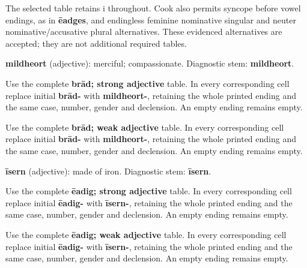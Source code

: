 The selected table retains i throughout. Cook also permits syncope before vowel endings, as in \textbf{ēadges}, and endingless feminine nominative singular and neuter nominative/\allowbreak{}accusative plural alternatives. These evidenced alternatives are accepted; they are not additional required tables.

\textbf{mildheort} (adjective): merciful; compassionate. Diagnostic stem: \textbf{mildheort}.

Use the complete \textbf{brād; strong adjective} table. In every corresponding cell replace initial \textbf{brād-} with \textbf{mildheort-}, retaining the whole printed ending and the same case, number, gender and declension. An empty ending remains empty.

Use the complete \textbf{brād; weak adjective} table. In every corresponding cell replace initial \textbf{brād-} with \textbf{mildheort-}, retaining the whole printed ending and the same case, number, gender and declension. An empty ending remains empty.

\textbf{īsern} (adjective): made of iron. Diagnostic stem: \textbf{īsern}.

Use the complete \textbf{ēadig; strong adjective} table. In every corresponding cell replace initial \textbf{ēadig-} with \textbf{īsern-}, retaining the whole printed ending and the same case, number, gender and declension. An empty ending remains empty.

Use the complete \textbf{ēadig; weak adjective} table. In every corresponding cell replace initial \textbf{ēadig-} with \textbf{īsern-}, retaining the whole printed ending and the same case, number, gender and declension. An empty ending remains empty.

